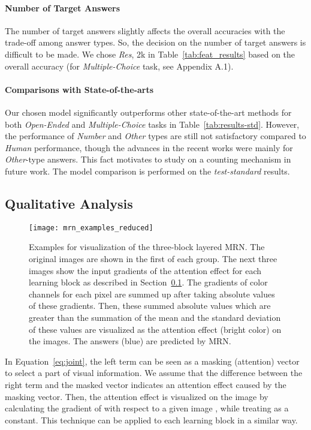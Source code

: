 \documentclass{article}
\begin{document}
\paragraph{Number of Target Answers} The number of target answers slightly affects the overall accuracies with the trade-off among answer types. So, the decision on the number of target answers is difficult to be made. We chose \textit{Res}, 2k in Table~\ref{tab:feat_results} based on the overall accuracy (for \textit{Multiple-Choice} task, see Appendix A.1).

\paragraph{Comparisons with State-of-the-arts} Our chosen model significantly outperforms other state-of-the-art methods for both \textit{Open-Ended} and \textit{Multiple-Choice} tasks in Table~\ref{tab:results-std}. However, the performance of \textit{Number} and \textit{Other} types are still not satisfactory compared to \textit{Human} performance, though the advances in the recent works were mainly for \textit{Other}-type answers. This fact motivates to study on a counting mechanism in future work. The model comparison is performed on the \textit{test-standard} results.

\subsection{Qualitative Analysis}
\label{subsec:visualization}

\begin{figure}[t!]
\centering
\texttt{[image: mrn\_examples\_reduced]}
\caption{Examples for visualization of the three-block layered MRN. The original images are shown in the first of each group. The next three images show the input gradients of the attention effect for each learning block as described in Section~\ref{subsec:visualization}. The gradients of color channels for each pixel are summed up after taking absolute values of these gradients. Then, these summed absolute values which are greater than the summation of the mean and the standard deviation of these values are visualized as the attention effect (bright color) on the images. The answers (blue) are predicted by MRN.}
\label{fig:examples}
\end{figure} 

In Equation~\ref{eq:joint}, the left term  can be seen as a masking (attention) vector to select a part of visual information. We assume that the difference between the right term  and the masked vector  indicates an attention effect caused by the masking vector. Then, the attention effect  is visualized on the image by calculating the gradient of  with respect to a given image , while treating  as a constant. 
This technique can be applied to each learning block in a similar way. 
\end{document}
